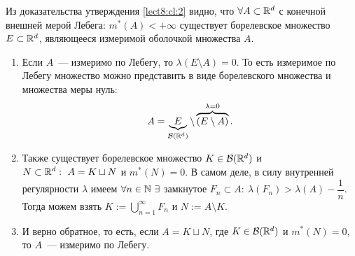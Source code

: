 \begin{remark}
    Из доказательства утверждения \ref{lect8:cl:2} видно, что $\forall A\subset \mathbb{R}^d$ с конечной внешней мерой Лебега: $m^*(A)<+\infty$ существует
    борелевское множество $E\subset\mathbb{R}^d$, являющееся измеримой оболочкой множества $A$.

    \begin{enumerate}
        \item Если $A$~--- измеримо по Лебегу, то $\lambda(E\setminus A)=0$. То есть измеримое по Лебегу множество можно представить в виде борелевского множества и
              множества меры нуль:
              \[
                  A = \underbrace{E}_{\mathcal{B}(\mathbb{R}^d)}\setminus \overbrace{(E\setminus A)}^{\lambda = 0}.
              \]
        \item Также существует борелевское множество $K\in\mathcal{B}(\mathbb{R}^d)$ и $N\subset\mathbb{R}^d:\ A=K\sqcup N$ и $m^*(N)=0$.
              В самом деле, в силу внутренней регулярности $\lambda$ имеем $\forall n\in\mathbb{N}\ \exists$ замкнутое $F_n\subset A:\ \lambda(F_n)>\lambda(A)-\dfrac{1}{n}$.
              Тогда можем взять $K:=\bigcup\limits_{n=1}^{\infty}F_n$ и $N:=A\setminus K$.
        \item И верно обратное, то есть, если $A=K\sqcup N$, где $K\in\mathcal{B}(\mathbb{R}^d)$ и $m^*(N)=0$, то $A$~--- измеримо по Лебегу.
    \end{enumerate}
\end{remark}